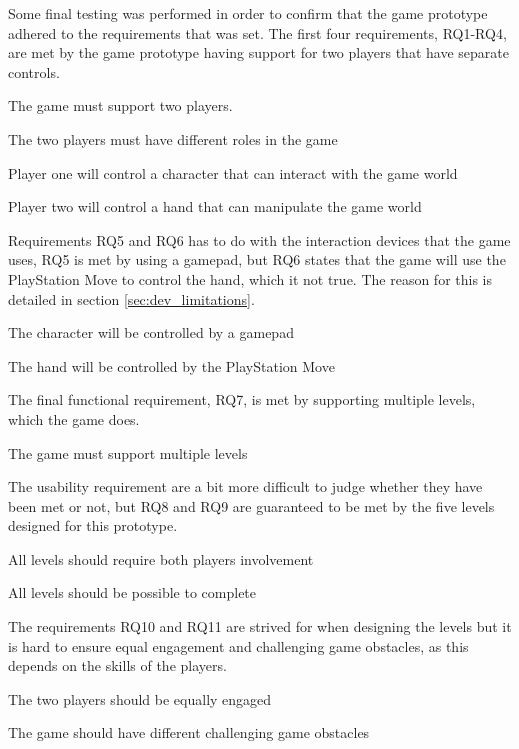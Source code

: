Some final testing was performed in order to confirm that the game prototype adhered to the requirements that was set. The first four requirements, RQ1-RQ4, are met by the game prototype having support for two players that have separate controls. 
\begin{description}
	\setlength\itemsep{0em}
	\item[RQ1] The game must support two players.
	\item[RQ2] The two players must have different roles in the game
	\item[RQ3] Player one will control a character that can interact with the game world
	\item[RQ4] Player two will control a hand that can manipulate the game world
\end{description}
Requirements RQ5 and RQ6 has to do with the interaction devices that the game uses, RQ5 is met by using a gamepad, but RQ6 states that the game will use the PlayStation Move to control the hand, which it not true. The reason for this is detailed in section \ref{sec:dev_limitations}.
\begin{description}
	\setlength\itemsep{0em}
	\item[RQ5] The character will be controlled by a gamepad
	\item[RQ6] The hand will be controlled by the PlayStation Move
\end{description}
The final functional requirement, RQ7, is met by supporting multiple levels, which the game does.
\begin{description}
	\setlength\itemsep{0em}
	\item[RQ7] The game must support multiple levels
\end{description}
The usability requirement are a bit more difficult to judge whether they have been met or not, but RQ8 and RQ9 are guaranteed to be met by the five levels designed for this prototype.
\begin{description}
	\setlength\itemsep{0em}
	\item[RQ8] All levels should require both players involvement
	\item[RQ9] All levels should be possible to complete	
\end{description}
The requirements RQ10 and RQ11 are strived for when designing the levels but it is hard to ensure equal engagement and challenging game obstacles, as this depends on the skills of the players.
\begin{description}
	\setlength\itemsep{0em}
	\item[RQ10] The two players should be equally engaged
	\item[RQ11] The game should have different challenging game obstacles
\end{description}


